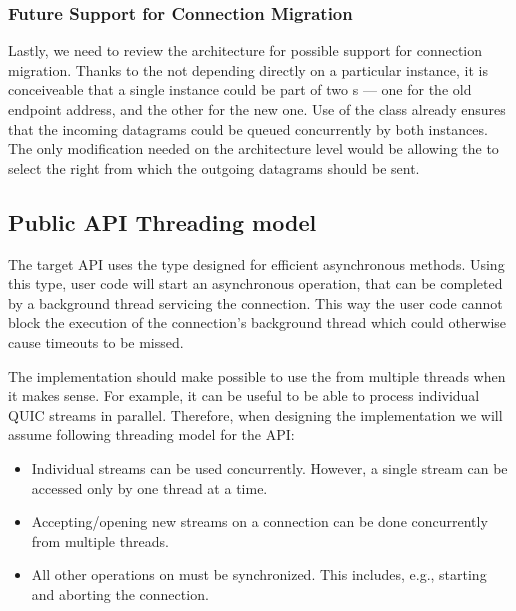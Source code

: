 \subsubsection{Future Support for Connection Migration}

Lastly, we need to review the architecture for possible support for connection migration. Thanks to
the \QuicConnectionContext{} not depending directly on a particular \Socket{} instance, it is
conceiveable that a single \QuicConnectionContext{} instance could be part of two
\QuicSocketContext{}s --- one for the old endpoint address, and the other for the new one. Use of the
 class already ensures that the incoming datagrams could be queued concurrently by
both \QuicSocketContext{} instances. The only modification needed on the architecture level would be
allowing the \QuicConnectionContext{} to select the right \Socket{} from which the outgoing
datagrams should be sent.

\subsection{Public API Threading model}


The target API uses the  type designed for efficient asynchronous methods. Using
this type, user code will start an asynchronous operation, that can be completed by a background
thread servicing the connection. This way the user code cannot block the execution of the
connection's background thread which could otherwise cause timeouts to be missed.

The implementation should make possible to use the \QuicConnection{} from multiple threads when
it makes sense. For example, it can be useful to be able to process individual QUIC streams in
parallel. Therefore, when designing the implementation we will assume following threading model for
the API:

\begin{itemize}

  \item Individual streams can be used concurrently. However, a single stream can be
    accessed only by one thread at a time.

  \item Accepting/opening new streams on a connection can be done concurrently from multiple threads.

  \item All other operations on \QuicConnection{} must be synchronized. This includes, e.g.,
    starting and aborting the connection.

\end{itemize}

